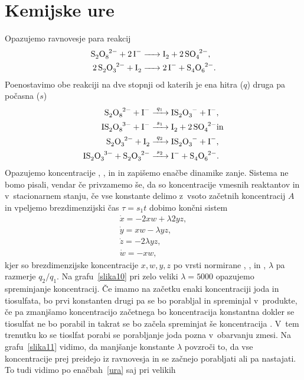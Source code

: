 \documentclass[a4paper,pdftex,12pt]{article}
\numberwithin{figure}{section} %
\begin{document}
\section{Kemijske ure}
Opazujemo ravnovesje para reakcij
\begin{align*}
    \ce{S2O8^2- + 2I- &-> I2 + 2SO4^2-}, \\
    \ce{2S2O3^2- + I2 &-> 2I^- + S4O6^2-}.
\end{align*}
Poenostavimo obe reakciji na dve stopnji od katerih je ena hitra ($q$) druga pa počasna 
($s$)
\begin{align*}
    \ce{S2O8^2- + I^- &->[\ce{$q_1$}] IS2O3- + I^-}, \\
    \ce{IS2O8^3- + I^- &->[\ce{$s_1$}] I2 + 2SO4^2-} \mathrm{in} \\
    \ce{S2O3^2- + I2 &->[\ce{$q_2$}] IS2O3- + I^-}, \\
    \ce{IS2O3^3- + S2O3^2- &->[\ce{$s_2$}] I^- + S4O6^2-}.
\end{align*}
Opazujemo koncentracije \ce{[I^-]}, \ce{[I2]}, \ce{[S2O3^2-]} in \ce{[S2O8^2-]} in zapišemo
enačbe dinamike zanje. Sistema ne bomo pisali, vendar če privzamemo še, da so koncentracije
vmesnih reaktantov \ce{[IS2O8^3-]} in \ce{[SO4^2-]} v~stacionarnem stanju, če vse
konstante delimo z~vsoto začetnih koncentracij $A$ in vpeljemo brezdimenzijski čas $\tau =
s_1 t$ dobimo končni sistem
\begin{align}\label{ura}
    \dot{x} = -2 x w + \lambda2 y z, \\
    \dot{y} = x w - \lambda y z, \\
    \dot{z} = - 2 \lambda y z, \\
    \dot{w} = - x w, 
\end{align}
kjer so brezdimenzijske koncentracije $x,w,y,z$ po vrsti normirane \ce{[I^-]}, \ce{[I2]}, 
\ce{[S2O3^2-]} in \ce{[S2O8^2-]}, $\lambda$ pa razmerje $q_2/q_1$. Na grafu~\ref{slika10}
pri zelo veliki $\lambda=5000$ opazujemo spreminjanje koncentracij. Če imamo na začetku
enaki koncentraciji joda  in tiosulfata, bo prvi konstanten drugi pa se bo porabljal
in spreminjal v~produkte, če pa zmanjšamo koncentracijo začetnega  bo
koncentracija  konstantna dokler se tiosulfat ne bo porabil in takrat se bo začela
spreminjat še koncentracija . V~tem trenutku ko se tioslfat porabi se porabljanje
joda pozna v~obarvanju zmesi. Na grafu~\ref{slika11} vidimo, da manjšanje konstante 
$\lambda$ povzroči to, da vse koncentracije prej preidejo iz ravnovesja in se začnejo
porabljati ali pa nastajati. To tudi vidimo po enačbah~\ref{ura} saj pri velikih
\end{document}
